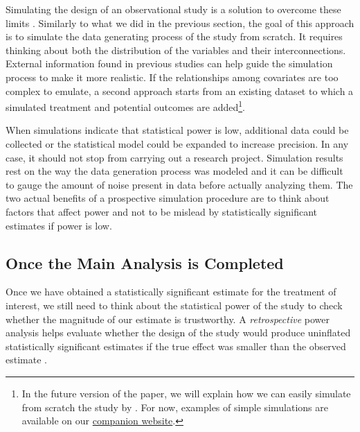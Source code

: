 \documentclass[12pt]{article}
\begin{document}
    Simulating the design of an observational study is a solution to overcome these limits \citep{hill_bayesian_2011, gelman_regression_2020, black_simulated_2021}. Similarly to what we did in the previous section, the goal of this approach is to simulate the data generating process of the study from scratch. It requires thinking about both the distribution of the variables and their interconnections. External information found in previous studies can help guide the simulation process to make it more realistic. If the relationships among covariates are too complex to emulate, a second approach starts from an existing dataset to which a simulated treatment and potential outcomes are added\footnote{In the future version of the paper, we will explain how we can easily simulate from scratch the study by \cite{card_using_1993}. For now, examples of simple simulations are available on our \href{https://vincentbagilet.github.io/causal_inflation/}{companion website}.}.

    When simulations indicate that statistical power is low, additional data could be collected or the statistical model could be expanded to increase precision. In any case, it should not stop from carrying out a research project. Simulation results rest on the way the data generation process was modeled and it can be difficult to gauge the amount of noise present in data before actually analyzing them. The two actual benefits of a prospective simulation procedure are to think about factors that affect power and not to be mislead by statistically significant estimates if power is low. 

\subsection{Once the Main Analysis is Completed}

    Once we have obtained a statistically significant estimate for the treatment of interest, we still need to think about the statistical power of the study to check whether the magnitude of our estimate is trustworthy. A \textit{retrospective} power analysis helps evaluate whether the design of the study would  produce uninflated statistically significant estimates if the true effect was smaller than the observed estimate \citep{gelman_beyond_2014, ioannidis_power_2017, stommes_reliability_2021}.
    
\end{document}

